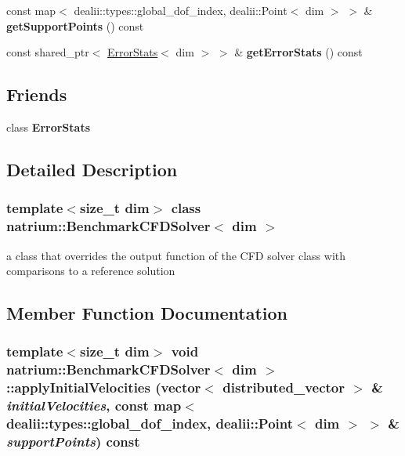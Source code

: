 \begin{DoxyCompactItemize}
\item 
\hypertarget{classnatrium_1_1BenchmarkCFDSolver_a659524b149a3650b0f62186e59e385ec}{
const map$<$ dealii::types::global\_\-dof\_\-index, dealii::Point$<$ dim $>$ $>$ \& {\bfseries getSupportPoints} () const }
\label{classnatrium_1_1BenchmarkCFDSolver_a659524b149a3650b0f62186e59e385ec}

\item 
\hypertarget{classnatrium_1_1BenchmarkCFDSolver_ac015d170b19024e63ff43f4a2e516fef}{
const shared\_\-ptr$<$ \hyperlink{classnatrium_1_1ErrorStats}{ErrorStats}$<$ dim $>$ $>$ \& {\bfseries getErrorStats} () const }
\label{classnatrium_1_1BenchmarkCFDSolver_ac015d170b19024e63ff43f4a2e516fef}

\end{DoxyCompactItemize}
\subsection*{Friends}
\begin{DoxyCompactItemize}
\item 
\hypertarget{classnatrium_1_1BenchmarkCFDSolver_a168e52694e19bf5c3e3136236b7b6888}{
class {\bfseries ErrorStats}}
\label{classnatrium_1_1BenchmarkCFDSolver_a168e52694e19bf5c3e3136236b7b6888}

\end{DoxyCompactItemize}


\subsection{Detailed Description}
\subsubsection*{template$<$size\_\-t dim$>$ class natrium::BenchmarkCFDSolver$<$ dim $>$}

a class that overrides the output function of the CFD solver class with comparisons to a reference solution 

\subsection{Member Function Documentation}
\hypertarget{classnatrium_1_1BenchmarkCFDSolver_a7883dcfd4469ae65ae62cad09ae5d160}{
\subsubsection[{applyInitialVelocities}]{\setlength{\rightskip}{0pt plus 5cm}template$<$size\_\-t dim$>$ void {\bf natrium::BenchmarkCFDSolver}$<$ dim $>$::applyInitialVelocities (vector$<$ distributed\_\-vector $>$ \& {\em initialVelocities}, \/  const map$<$ dealii::types::global\_\-dof\_\-index, dealii::Point$<$ dim $>$ $>$ \& {\em supportPoints}) const}}
\label{classnatrium_1_1BenchmarkCFDSolver_a7883dcfd4469ae65ae62cad09ae5d160}


